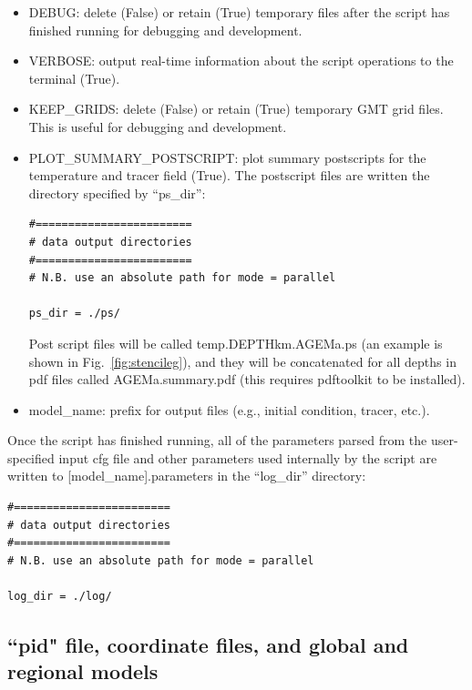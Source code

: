 \documentclass[letterpaper,12pt]{article}
\begin{document}
\begin{itemize}
\item DEBUG: delete (False) or retain (True) temporary files after the script has finished running for debugging and development.
\item VERBOSE: output real-time information about the script operations to the terminal (True).
\item KEEP\_GRIDS: delete (False) or retain (True) temporary GMT grid files.  This is useful for debugging and development.
\item PLOT\_SUMMARY\_POSTSCRIPT: plot summary postscripts for the temperature and tracer field (True).  The postscript files are written the directory specified by ``ps\_dir'':
\begin{verbatim}
#========================
# data output directories
#========================
# N.B. use an absolute path for mode = parallel

ps_dir = ./ps/
\end{verbatim}
Post script files will be called temp.DEPTHkm.AGEMa.ps (an example is shown in Fig.~\ref{fig:stencileg}), and they will be concatenated for all depths in pdf files called AGEMa.summary.pdf (this requires pdftoolkit to be installed). 
\item model\_name: prefix for output files (e.g., initial condition, tracer, etc.).
\end{itemize}
Once the script has finished running, all of the parameters parsed from the user-specified input cfg file and other parameters used internally by the script are written to [model\_name].parameters in the ``log\_dir'' directory:
\begin{verbatim}
#========================
# data output directories
#========================
# N.B. use an absolute path for mode = parallel

log_dir = ./log/
\end{verbatim}

\subsection{``pid" file, coordinate files, and global and regional models}
\end{document}
